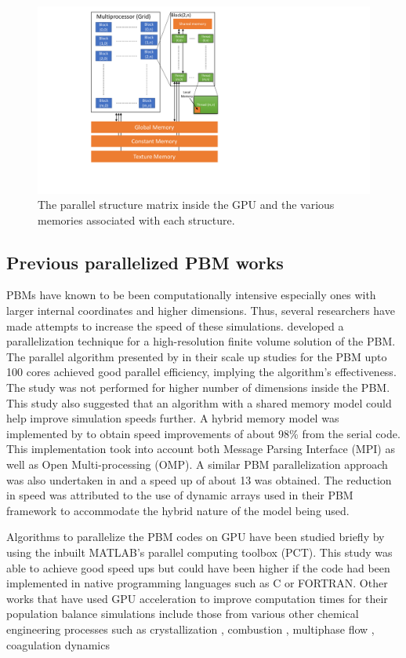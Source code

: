 \documentclass[preprint,10pt,authoryear,review]{elsarticle}
\begin{document}
\begin{linenumbers}
\begin{figure}[h]
\centering
\includegraphics[scale=0.75]{gpu_arch_new.pdf}
\caption{The parallel structure matrix inside the GPU and the various memories associated 
with each structure.}
\label{fig:bkg_gpu_arch}
\end{figure}


\subsection{Previous parallelized PBM works}
PBMs have known to be been computationally intensive especially ones with larger internal 
coordinates and higher dimensions. Thus, several researchers have made attempts to increase 
the speed of these simulations. \cite{Gunawan2008} developed a parallelization technique 
for a high-resolution finite volume solution of the PBM. The parallel algorithm presented by 
\cite{Gunawan2008} in their scale up studies for the PBM upto 100 cores achieved good 
parallel efficiency, implying the algorithm's effectiveness. The study was not performed for 
higher number of dimensions inside the PBM. This study also suggested that an algorithm 
with a shared memory model could help improve simulation speeds further. A hybrid memory model 
was implemented by \cite{Bettencourt2017} to obtain speed improvements of about 98\% from the 
serial code. This implementation took into account both Message Parsing Interface (MPI) as well 
as Open Multi-processing (OMP). A similar PBM parallelization approach was also undertaken in 
\citep{Sampat2018} and a speed up of about 13 was obtained. The reduction in speed was attributed 
to the use of dynamic arrays used in their PBM framework to accommodate the hybrid nature of the 
model being used. 

Algorithms to parallelize the PBM codes on GPU have been studied briefly by \cite{Prakash2013b} 
using the inbuilt MATLAB's parallel computing toolbox (PCT). This study was able to achieve 
good speed ups but could have been higher if the code had been implemented in native programming 
languages such as C or FORTRAN. Other works that have used GPU acceleration to improve computation 
times for their population balance simulations include those from various other chemical engineering 
processes such as crystallization \citep{Szilagy2016} , combustion \citep{Shi2012} , multiphase flow 
\citep{santos2013} , coagulation dynamics \citep{Xu2015}



\end{linenumbers}
\end{document}
